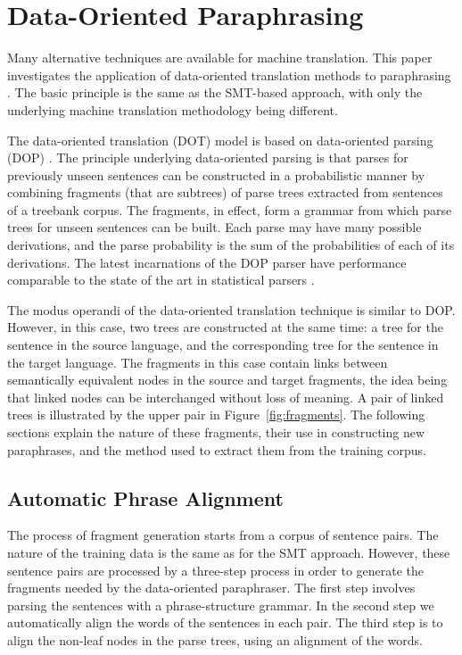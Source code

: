 \section{Data-Oriented Paraphrasing}
\label{sec:DOP}

Many alternative techniques are available for machine translation. This paper investigates the
application of data-oriented translation methods \cite{poutsma:98} to paraphrasing \cite{finch:ranlp2003}.
The basic principle is the same as the SMT-based approach, with only the underlying machine translation
methodology being different.

The data-oriented translation (DOT) model is based on data-oriented parsing (DOP) \cite{bod99beyond}. The principle
underlying data-oriented parsing is that parses for previously unseen sentences can be constructed in a
probabilistic manner by combining fragments (that are subtrees) of parse trees extracted from sentences of a
treebank corpus.  The fragments, in effect, form a grammar from which parse trees for unseen sentences can be
built.   Each parse may have many possible derivations, and the  parse probability is the sum of the
probabilities of each of its derivations. The latest incarnations of the DOP parser have performance comparable
to the state of the art in statistical parsers \cite{bod:01}.

The modus operandi of the data-oriented translation technique is similar to DOP. However, in this case, two
trees are constructed at the same time: a tree for the sentence in the source language, and the corresponding
tree for the sentence in the target language. The fragments in this case contain links between semantically
equivalent nodes in the source and target fragments, the idea being  that linked nodes can be interchanged
without loss of meaning.  A pair of linked trees is illustrated by the upper pair in Figure~\ref{fig:fragments}.
The following sections explain the nature of these fragments, their use in constructing new paraphrases, and 
the method used to extract them from the training corpus.



\subsection{Automatic Phrase Alignment}
\label{sec:phrasealign}

The process of fragment generation starts from a corpus of sentence pairs. The nature of the training data  is
the same as for the SMT approach. However, these sentence pairs are processed by a three-step process in order
to generate the fragments needed by the data-oriented paraphraser. The first step involves parsing the sentences
with a phrase-structure grammar. In the second step we automatically align the words of the sentences in each
pair. The third step is to align the non-leaf nodes in the parse trees, using an alignment of the words.


